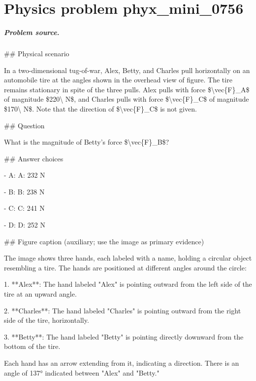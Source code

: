 
\chapter{Physics problem phyx\_mini\_0756}
\label{ch:PhyXMiniProblems_problem_phyx_mini_0756}

\paragraph{Problem source.}
\#\# Physical scenario

In a two-dimensional tug-of-war, Alex, Betty, and Charles pull horizontally on an automobile tire at the angles shown in the overhead view of figure. The tire remains stationary in spite of the three pulls. Alex pulls with force \$\textbackslash{}vec\{F\}\_A\$ of magnitude \$220\textbackslash{} N\$, and Charles pulls with force \$\textbackslash{}vec\{F\}\_C\$ of magnitude \$170\textbackslash{} N\$. Note that the direction of \$\textbackslash{}vec\{F\}\_C\$ is not given.

\#\# Question

What is the magnitude of Betty's force \$\textbackslash{}vec\{F\}\_B\$?

\#\# Answer choices

- A: A: 232 N

- B: B: 238 N

- C: C: 241 N

- D: D: 252 N

\#\# Figure caption (auxiliary; use the image as primary evidence)

The image shows three hands, each labeled with a name, holding a circular object resembling a tire. The hands are positioned at different angles around the circle:

1. **Alex**: The hand labeled "Alex" is pointing outward from the left side of the tire at an upward angle.
   
2. **Charles**: The hand labeled "Charles" is pointing outward from the right side of the tire, horizontally.

3. **Betty**: The hand labeled "Betty" is pointing directly downward from the bottom of the tire.

Each hand has an arrow extending from it, indicating a direction. There is an angle of 137° indicated between "Alex" and "Betty."

